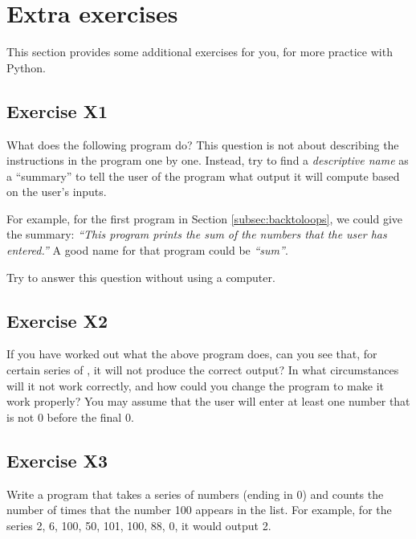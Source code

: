 \section{Extra exercises}
\label{sec:additional-exercises}

This section provides some additional exercises for you, for more
practice with Python.  

\subsection*{Exercise X1}

What does %
the following
program do? This question is not about describing
the instructions in the program one by one. Instead, try to find a
\emph{descriptive name} as a ``summary'' to tell the user of the
program what output it will compute based on the user's inputs.

For example, for the first program in
Section \ref{subsec:backtoloops}, we could give the summary:
\emph{``This program prints
the sum of the numbers that the user has entered.''}
A good name for that program could be \emph{``sum''}.

Try to answer this question without using a computer.


\subsection*{Exercise X2}

If you have worked out what the above program does, can you
see that, for certain series of , it will not produce the correct
output?  In what circumstances will it not work correctly, and how could
you change the program to make it work properly?
You may assume that the user will enter at least one number that is
not 0 before the final 0.

\subsection*{Exercise X3}

Write a program that takes a series of numbers (ending in 0) and counts
the number of times that the number 100 appears in the list.  For example,
for the series 2, 6, 100, 50, 101, 100, 88, 0, it would output 2.

